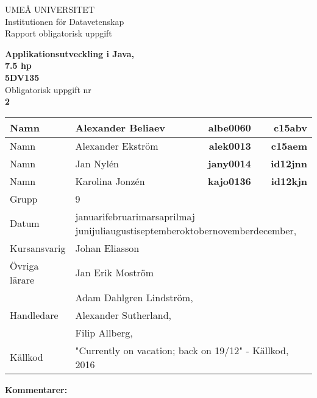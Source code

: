 \documentclass[10pt]{article}
\makeatletter
\newcommand{\sqbox}{%
	\collectbox{%
		\@tempdima=\dimexpr\width-\totalheight\relax
		\ifdim\@tempdima<\z@
		\fbox{\hbox{\hspace{-.5\@tempdima}\BOXCONTENT\hspace{-.5\@tempdima}}}%
		\else
		\ht\collectedbox=\dimexpr\ht\collectedbox+.5\@tempdima\relax
		\dp\collectedbox=\dimexpr\dp\collectedbox+.5\@tempdima\relax
		\fbox{\BOXCONTENT}%
		\fi
	}%
}
\renewcommand{\today}{\number\day \space%
	\ifcase \month \or januari\or februari\or mars\or april\or maj%
	\or juni\or juli\or augusti\or september\or oktober\or november\or december\fi,\space%
	\number \year}
\makeatother
\begin{document}
	\begin{titlepage}
		\noindent UMEÅ UNIVERSITET\\
		Institutionen för Datavetenskap\\
		Rapport obligatorisk uppgift\\
		\begin{center}
			{\Large \bfseries Applikationsutveckling i Java,\\7.5 hp\\5DV135\\}
			\vspace{0.5cm}
			{Obligatorisk uppgift nr\\}
			\vspace{0.20cm}
			{\Huge \bfseries \sqbox{ 2 }\\}
			\vspace{1.0cm}
			\bgroup
			\def\arraystretch{2}
			\begin{Form}
				\begin{tabularx}{\textwidth}{|l|X|r|r|}
					\hline
					Namn & Alexander Beliaev & \textbf{albe0060} &\textbf{c15abv}\\
					\hline
					Namn & Alexander Ekström & \textbf{alek0013} &\textbf{c15aem}\\
					\hline
					Namn & Jan Nylén & \textbf{jany0014} &\textbf{id12jnn}\\
					\hline
					Namn & Karolina Jonzén & \textbf{kajo0136} &\textbf{id12kjn}\\
					\hline
					Grupp & \multicolumn{3}{l|}{9}\\
					\hline
					Datum & \multicolumn{3}{l|}{\today}\\
					\hline
					Kursansvarig & \multicolumn{3}{l|}{Johan Eliasson}\\
					\hline
					Övriga lärare & \multicolumn{3}{l|}{Jan Erik Moström}\\
					\hline
					\multirow{3}{*}{Handledare} &\multicolumn{3}{l|}{\mbox Adam Dahlgren Lindström,}\\
					&\multicolumn{3}{l|}{\mbox Alexander Sutherland,}\\
					&\multicolumn{3}{l|}{\mbox Filip Allberg,}\\
					\hline
					Källkod & \multicolumn{3}{l|}{"Currently on vacation; back on 19/12" - Källkod, 2016}\\
					\hline
				\end{tabularx}
			\end{Form}
			\egroup
		\end{center}
		\vspace{0.25cm}
		\textbf{ Kommentarer:}
	\end{titlepage}
	
\end{document}
